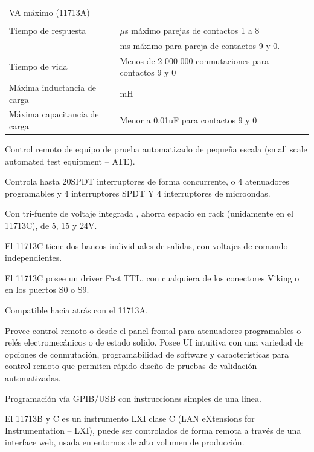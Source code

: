 \begin{flushleft}
\begin{supertabular}{|m{4.795cm}|m{11.89cm}|}
		\centering{} VA máximo (11713A)\\\hhline{~-}
		\\\hline
		\centering Tiempo de respuesta  &
		\centering{} $\mu $s máximo parejas de contactos 1 a 8\\\hline
		&
		\centering{} ms máximo para pareja de contactos 9 y 0.\\\hhline{~-}
		\centering Tiempo de vida &
		\centering\arraybslash Menos de 2 000 000 conmutaciones para contactos 9 y 0\\\hline
		\centering Máxima inductancia de carga &
		\centering{} mH\\\hline
		\centering Máxima capacitancia de carga &
		\centering\arraybslash Menor a 0.01uF para contactos 9 y 0\\\hline
	\end{supertabular}
\end{flushleft}


Control remoto de equipo de prueba automatizado de pequeña escala (small scale automated test equipment – ATE). 

Controla hasta 20SPDT interruptores de forma concurrente, o 4 atenuadores programables y 4 interruptores SPDT Y 4
interruptores de microondas.

Con tri-fuente de voltaje integrada , ahorra espacio en rack (unidamente en el 11713C), de 5, 15 y 24V.

El 11713C tiene dos bancos individuales de salidas, con voltajes de comando independientes.

El 11713C posee un driver Fast TTL, con cualquiera de los conectores Viking o en los puertos S0 o S9.

Compatible hacia atrás con el 11713A.

Provee control remoto o desde el panel frontal para atenuadores programables o relés electromecánicos o de estado
solido. Posee UI intuitiva con una variedad de opciones de conmutación, programabilidad de software y características
para control remoto que permiten rápido diseño de pruebas de validación automatizadas.

Programación vía GPIB/USB con instrucciones simples de una linea.

El 11713B y C es un instrumento LXI clase C (LAN eXtensions for Instrumentation – LXI), puede ser controlados de forma
remota a través de una interface web, usada en entornos de alto volumen de producción. 

